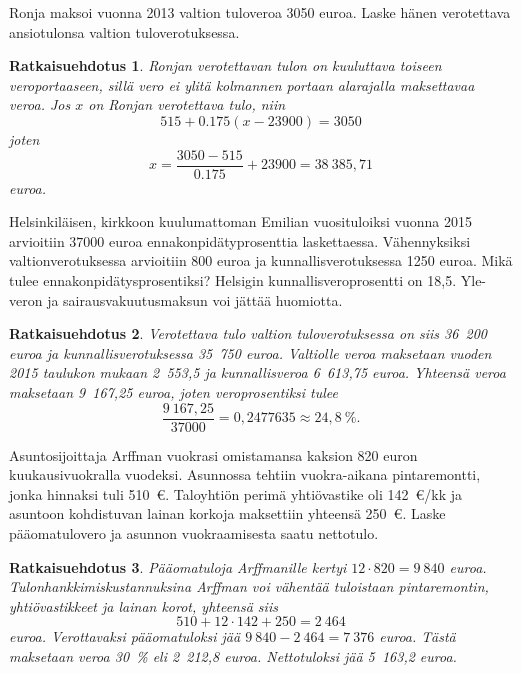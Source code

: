 \documentclass[a4paper,10pt]{article}\usepackage[]{graphicx}\usepackage[]{color}
\newtheorem*{ratk}{Ratkaisuehdotus}
\begin{document}
\begin{teht} Ronja maksoi vuonna 2013 valtion tuloveroa 3050 euroa. Laske hänen verotettava ansiotulonsa valtion tuloverotuksessa.
\end{teht}
\begin{ratk}
	Ronjan verotettavan tulon on kuuluttava toiseen veroportaaseen, sillä vero ei ylitä kolmannen portaan alarajalla maksettavaa veroa. Jos \(x\) on Ronjan verotettava tulo, niin
\[
	515 + 0.175(x - 23900) = 3050
\]
joten 
\[
	x = \frac{3050 - 515}{0.175} + 23900 = 38~385{,}71
\]
euroa.
\end{ratk}

\begin{teht} Helsinkiläisen, kirkkoon kuulumattoman Emilian vuosituloiksi vuonna 2015 arvioitiin \(37 000\) euroa ennakonpidätyprosenttia laskettaessa. Vähennyksiksi valtionverotuksessa arvioitiin 800 euroa ja kunnallisverotuksessa 1250 euroa. Mikä tulee ennakonpidätysprosentiksi? Helsigin kunnallisveroprosentti on 18,5. Yle-veron ja sairausvakuutusmaksun voi jättää huomiotta.
\end{teht}
\begin{ratk}
	Verotettava tulo valtion tuloverotuksessa on siis 36~200 euroa ja kunnallisverotuksessa 35~750 euroa. Valtiolle veroa maksetaan vuoden 2015 taulukon mukaan 2~553{,}5 ja kunnallisveroa 6~613{,}75 euroa. Yhteensä veroa maksetaan 9~167{,}25 euroa, joten veroprosentiksi tulee
\[
	\frac{9~167{,}25}{37000} = 0{,}2477635\approx 24{,}8~\%.
\]
 
\end{ratk}


\begin{teht} Asuntosijoittaja Arffman vuokrasi omistamansa kaksion 820 euron kuukausivuokralla vuodeksi. Asunnossa tehtiin vuokra-aikana pintaremontti, jonka hinnaksi tuli 510~\euro. Taloyhtiön perimä yhtiövastike oli 142~\euro/kk ja asuntoon kohdistuvan lainan korkoja maksettiin yhteensä 250~\euro. Laske pääomatulovero ja asunnon vuokraamisesta saatu nettotulo.
\end{teht}
\begin{ratk}
	Pääomatuloja Arffmanille kertyi \(12\cdot820 = 9~840\) euroa. Tulonhankkimiskustannuksina Arffman voi vähentää tuloistaan pintaremontin, yhtiövastikkeet ja lainan korot, yhteensä siis 
\[
	510 + 12\cdot142 + 250 = 2~464 
\]
euroa. Verottavaksi pääomatuloksi jää \(9~840 - 2~464 = 7~376\) euroa. Tästä maksetaan veroa 30~\% eli 2~212{,}8 euroa. Nettotuloksi jää 5~163{,}2 euroa.
\end{ratk}
\end{document}
